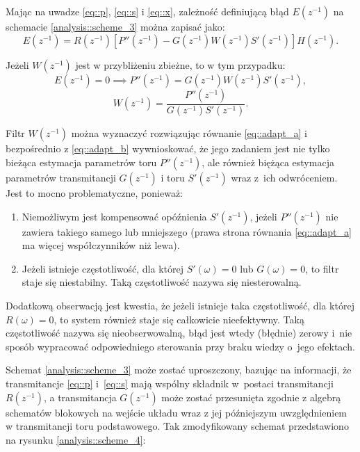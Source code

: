 Mając na uwadze \ref{eq::p}, \ref{eq::s} i \ref{eq::x}, zależność definiującą
błąd $E(z^{-1})$ na schemacie \ref{analysis::scheme_3} można zapisać jako:
\begin{equation}
    E(z^{-1}) = R(z^{-1})\left[P''(z^{-1}) - G(z^{-1})W(z^{-1})S'(z^{-1})\right]H(z^{-1}).
\end{equation}

Jeżeli $W(z^{-1})$ jest w przybliżeniu zbieżne, to w tym przypadku:
\begin{equation}
    E(z^{-1}) = 0 \implies P''(z^{-1}) = {G(z^{-1})W(z^{-1})S'(z^{-1})},
    \label{eq::adapt_a}
\end{equation}
\begin{equation}
    W(z^{-1}) = \frac{P''(z^{-1})}{G(z^{-1})S'(z^{-1})}.
    \label{eq::adapt_b}
\end{equation}

Filtr $W(z^{-1})$ można wyznaczyć rozwiązując równanie \ref{eq::adapt_a} i
bezpośrednio z \ref{eq::adapt_b} wywnioskować, że jego zadaniem jest nie tylko
bieżąca estymacja parametrów toru $P''(z^{-1})$, ale również biężąca estymacja
parametrów transmitancji $G(z^{-1})$ i toru $S'(z^{-1})$ wraz z~ich odwróceniem.
Jest to mocno problematyczne, ponieważ:
\begin{enumerate} 

    \item Niemożliwym jest kompensować opóźnienia $S'(z^{-1})$, jeżeli
    $P''(z^{-1})$ nie zawiera takiego samego lub mniejszego (prawa strona
    równania \ref{eq::adapt_a} ma więcej współczynników niż lewa).

    \item Jeżeli istnieje częstotliwość, dla której $S'(\omega) = 0$ lub
    $G(\omega) = 0$, to filtr staje się niestabilny. Taką częstotliwość nazywa
    się niesterowalną.

\end{enumerate}

Dodatkową obserwacją jest kwestia, że jeżeli istnieje taka częstotliwość, dla
której $R(\omega) = 0$, to system również staje się całkowicie nieefektywny.
Taką częstotliwość nazywa się nieobserwowalną, błąd jest wtedy (błędnie) zerowy
i~nie sposób wypracować odpowiedniego sterowania przy braku wiedzy o~jego
efektach.

\par Schemat \ref{analysis::scheme_3} może zostać uproszczony, bazując na
informacji, że transmitancje \ref{eq::p} i~\ref{eq::s} mają wspólny składnik
w~postaci transmitancji $R(z^{-1})$, a transmitancja $G(z^{-1})$ może zostać
przesunięta zgodnie z algebrą schematów blokowych na wejście układu wraz z jej
późniejszym uwzględnieniem w transmitancji toru podstawowego. Tak zmodyfikowany
schemat przedstawiono na rysunku \ref{analysis::scheme_4}:

